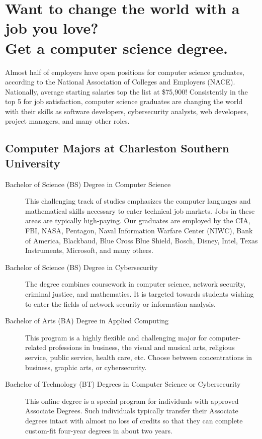 %
\section*{Want to change the world with a job you love?\\
Get a computer science degree.}
Almost half of employers have open positions for computer science graduates, according to the National Association of Colleges and Employers (NACE). Nationally, average starting salaries top the list at \$75,900! Consistently in the top 5 for job satisfaction, computer science graduates are changing the world with their skills as software developers, cybersecurity analysts, web developers, project managers, and many other roles.

\subsection{Computer Majors at Charleston Southern University}
\begin{description}

	\item[Bachelor of Science (BS) Degree in Computer Science] This challenging track of studies emphasizes the computer languages and mathematical skills necessary to enter technical job markets. Jobs in these areas are typically high-paying. Our graduates are employed by the CIA, FBI, NASA, Pentagon, Naval Information Warfare Center (NIWC), Bank of America, Blackbaud, Blue Cross Blue Shield, Bosch, Disney, Intel, Texas Instruments, Microsoft, and many others.
	\item[Bachelor of Science (BS) Degree in Cybersecurity] The degree combines coursework in computer science, network security, criminal justice, and mathematics. It is targeted towards students wishing to enter the fields of network security or information analysis.
		\item[Bachelor of Arts (BA) Degree in Applied Computing] This program is a highly flexible and challenging major for computer-related professions in business, the visual and musical arts, religious service, public service, health care, etc. Choose between concentrations in business, graphic arts, or cybersecurity.
		\item[Bachelor of Technology (BT) Degrees in Computer Science or Cybersecurity] This online degree is a special program for individuals with approved Associate Degrees. Such individuals typically transfer their Associate degrees intact with almost no loss of credits so that they can complete custom-fit four-year degrees in about two years.\vspace{0.5em}
\end{description}

